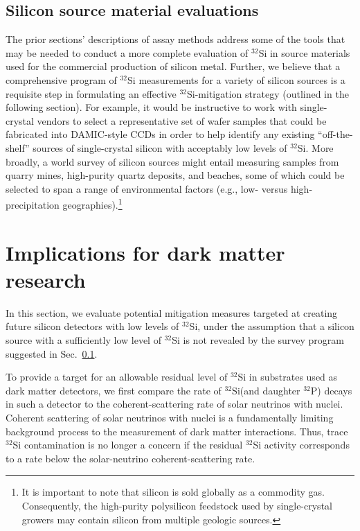 \documentclass[final,5p]{elsarticle}
\def\si{$^{32}$Si\xspace}
\def\p{$^{32}$P\xspace}
\begin{document}
\subsection{Silicon source material evaluations}\label{ssec:survey}
  The prior sections' descriptions of assay methods address some of the tools that may be needed to conduct a more complete evaluation of \si in source materials used for the commercial production of silicon metal. Further, we believe that a comprehensive program of \si measurements for a variety of silicon sources is a requisite step in formulating an effective \si-mitigation strategy (outlined in the following section). For example, it would be instructive to work with single-crystal vendors to select a representative set of wafer samples that could be fabricated into DAMIC-style CCDs in order to help identify any existing ``off-the-shelf'' sources of single-crystal silicon with acceptably low levels of \si. More broadly, a world survey of silicon sources might entail measuring samples from quarry mines, high-purity quartz deposits, and beaches, some of which could be selected to span a range of environmental factors (e.g., low- versus high-precipitation geographies).\footnote{It is important to note that silicon is sold globally as a commodity gas. Consequently, the high-purity polysilicon feedstock used by single-crystal growers may contain silicon from multiple geologic sources.}

\section{Implications for dark matter research}\label{sec:implications}
In this section, we evaluate potential mitigation measures targeted at creating future silicon detectors with low levels of \si, under the assumption that a silicon source with a sufficiently low level of \si is not revealed by the survey program suggested in Sec.~\ref{ssec:survey}. 

To provide a target for an allowable residual level of \si in substrates used as dark matter detectors, we first compare the rate of \si (and daughter \p) decays in such a detector to the coherent-scattering rate of solar neutrinos with nuclei. Coherent scattering of solar neutrinos with nuclei is a fundamentally limiting background process to the measurement of dark matter interactions. Thus, trace \si contamination is no longer a concern if the residual \si activity corresponds to a rate below the solar-neutrino coherent-scattering rate.
\end{document}
